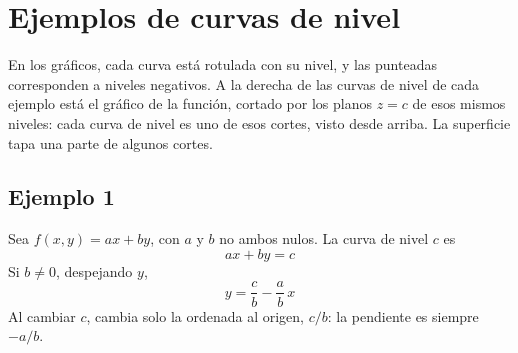 \documentclass{article}
\begin{document}
\section*{Ejemplos de curvas de nivel}

En los gráficos, cada curva está rotulada con su nivel, y las punteadas corresponden a niveles negativos. A la derecha de las curvas de nivel de cada ejemplo está el gráfico de la función, cortado por los planos \(z=c\) de esos mismos niveles: cada curva de nivel es uno de esos cortes, visto desde arriba. La superficie tapa una parte de algunos cortes.

\subsection*{Ejemplo 1}

Sea \(f(x,y)=ax+by\), con \(a\) y \(b\) no ambos nulos. La curva de nivel \(c\) es
\[
ax+by=c
\]
Si \(b\neq0\), despejando \(y\),
\[
y=\frac{c}{b}-\frac{a}{b}\,x
\]
Al cambiar \(c\), cambia solo la ordenada al origen, \(c/b\): la pendiente es siempre \(-a/b\).

\end{document}
